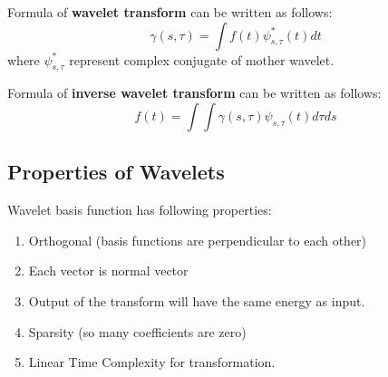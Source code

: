 \documentclass[11pt]{report}
\begin{document}
Formula of \textbf{wavelet transform} can be written as follows:
\begin{equation}
\gamma(s,\tau)=\int f(t)\psi_{s,\tau}^*(t)dt
\end{equation}
where $\psi_{s,\tau}^*$ represent complex conjugate of mother wavelet.

Formula of \textbf{inverse wavelet transform} can be written as follows:
\begin{equation}
f(t)=\int \int \gamma (s,\tau)\psi_{s,\tau}(t)d \tau ds
\end{equation}


\subsection{Properties of Wavelets}
Wavelet basis function has following properties:
\begin{enumerate}
\item Orthogonal (basis functions are perpendicular to each other)
\item Each vector is normal vector 
\item Output of the transform will have the same energy as input.
\item Sparsity (so many coefficients are zero) 
\item Linear Time Complexity for transformation.
\end{enumerate}
\end{document}
